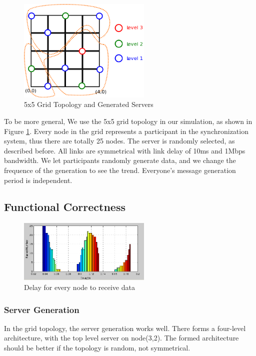 \documentclass[conference]{IEEEtran}
\begin{document}
\begin{figure}[!t]
\centering
\includegraphics[width=2.5in]{../png/paper-topo.png}
\caption{5x5 Grid Topology and Generated Servers}
\label{paper_topo}
\end{figure}
To be more general, We use the 5x5 grid topology in our simulation, as shown in Figure \ref{paper_topo}. Every node in the grid represents a participant in the synchronization system, thus there are totally 25 nodes. The server is randomly selected, as described before. All links are symmetrical with link delay of 10ms and 1Mbps bandwidth. We let participants randomly generate data, and we change the frequence of the generation to see the trend. Everyone's message generation period is independent.

\subsection{Functional Correctness}
\begin{figure}[!t]
\centering
\includegraphics[width=2.5in]{../png/function-delay.png}
\caption{Delay for every node to receive data}
\label{function_delay}
\end{figure}
\subsubsection{Server Generation} In the grid topology, the server generation works well. There forms a four-level architecture, with the top level server on node(3,2). The formed architecture should be better if the topology is random, not symmetrical.
\end{document}
